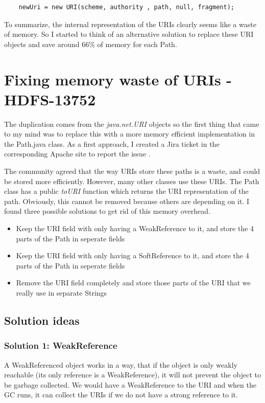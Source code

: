 \begin{lstlisting}
	newUri = new URI(scheme, authority , path, null, fragment);
\end{lstlisting}

To summarize, the internal representation of the URIs clearly seems like a waste of memory. So I started to think of an alternative solution to replace these URI objects and save around 66\% of memory for each Path. 

\chapter{Fixing memory waste of URIs - HDFS-13752}
The duplication comes from the \textit{java.net.URI} objects so the first thing that came to my mind was to replace this with a more memory efficient implementation in the Path.java class. As a first approach, I created a Jira ticket in the corresponding Apache site to report the issue \cite{hdfs-path}. 

The community agreed that the way URIs store these paths is a waste, and could be stored more efficiently. However, many other classes use these URIs. The Path class has a public \textit{toURI} function which returns the URI representation of the path. Obviously, this cannot be removed because others are depending on it. I found three possible solutions to get rid of this memory overhead.

\begin{itemize}
	\item Keep the URI field with only having a WeakReference to it, and store the 4 parts of the Path in seperate fields
	\item Keep the URI field with only having a SoftReference to it, and store the 4 parts of the Path in seperate fields
	\item Remove the URI field completely and store those parts of the URI that we really use in separate Strings
\end{itemize}
\section{Solution ideas}
\subsection{Solution 1: WeakReference}
A WeakReferenced object works in a way, that if the object is only weakly reachable (its only reference is a WeakReference), it will not prevent the object to be garbage collected. We would have a WeakReference to the URI and when the GC runs, it can collect the URIs if we do not have a strong reference to it. 

